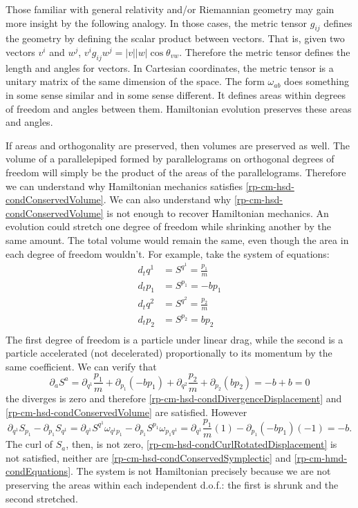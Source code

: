Those familiar with general relativity and/or Riemannian geometry may gain more insight by the following analogy. In those cases, the metric tensor $g_{ij}$ defines the geometry by defining the scalar product between vectors. That is, given two vectors $v^i$ and $w^j$, $v^i g_{ij} w^j = |v| |w| \cos \theta_{vw}$. Therefore the metric tensor defines the length and angles for vectors. In Cartesian coordinates, the metric tensor is a unitary matrix of the same dimension of the space. The form $\omega_{ab}$ does something in some sense similar and in some sense different. It defines areas within degrees of freedom and angles between them. Hamiltonian evolution preserves these areas and angles.

If areas and orthogonality are preserved, then volumes are preserved as well. The volume of a parallelepiped formed by parallelograms on orthogonal degrees of freedom will simply be the product of the areas of the parallelograms. Therefore we can understand why Hamiltonian mechanics satisfies \ref{rp-cm-hsd-condConservedVolume}. We can also understand why \ref{rp-cm-hsd-condConservedVolume} is not enough to recover Hamiltonian mechanics. An evolution could stretch one degree of freedom while shrinking another by the same amount. The total volume would remain the same, even though the area in each degree of freedom wouldn't. For example, take the system of equations:
\begin{equation}
	\begin{aligned}
	d_t q^1 &= S^{q^1} = \frac{p_1}{m} \\
	d_t p_1 &= S^{p_1} = - b p_1 \\
	d_t q^2 &= S^{q^2} = \frac{p_2}{m} \\
	d_t p_2 &= S^{p_2} = b p_2 \\
	\end{aligned}
\end{equation}
The first degree of freedom is a particle under linear drag, while the second is a particle accelerated (not decelerated) proportionally to its momentum by the same coefficient. We can verify that
\begin{equation}
	\partial_a S^a = \partial_{q^1} \frac{p_1}{m} + \partial_{p_1} (-b p_1) + \partial_{q^2} \frac{p_2}{m} + \partial_{p_2} (b p_2) = - b +b = 0
\end{equation}
the diverges is zero and therefore \ref{rp-cm-hsd-condDivergenceDisplacement} and \ref{rp-cm-hsd-condConservedVolume} are satisfied. However
\begin{equation}
	\partial_{q^1} S_{p_1} - \partial_{p_1} S_{q^1} = \partial_{q^1} S^{q^1} \omega_{q^1 p_1} - \partial_{p_1} S^{p_1} \omega_{p_1 q^1} = \partial_{q^1} \frac{p_1}{m} (1) - \partial_{p_1} (-b p_1) (-1) = -b.
\end{equation}
The curl of $S_a$, then, is not zero, \ref{rp-cm-hsd-condCurlRotatedDisplacement} is not satisfied, neither are \ref{rp-cm-hsd-condConservedSymplectic} and \ref{rp-cm-hmd-condEquations}. The system is not Hamiltonian precisely because we are not preserving the areas within each independent d.o.f.: the first is shrunk and the second stretched.

